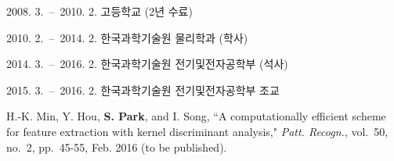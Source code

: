 \documentclass[master,english,final,hidelinks]{kaist-ucs}
\begin{document}
	\curriculumvitae[4]

	\begin{personaldata}
		\address    {}
	\end{personaldata}

	\begin{education}
		\item[2008. 3.\ --\ 2010. 2.] 고등학교 (2년 수료)
		\item[2010. 2.\ --\ 2014. 2.] 한국과학기술원 물리학과 (학사)
		\item[2014. 3.\ --\ 2016. 2.] 한국과학기술원 전기및전자공학부 (석사)
	\end{education}

	\begin{career}
		\item[2015. 3.\ --\ 2016. 2.] 한국과학기술원 전기및전자공학부 조교
	\end{career}


	\begin{publication}
		\item H.-K. Min, Y. Hou, {\bf S. Park}, and I. Song,
		``A computationally efficient scheme for feature extraction with kernel discriminant analysis,"
		\textit{Patt. Recogn.}, vol.~50, no.~2, pp.~45-55, Feb. 2016 (to be published).
	\end{publication}

	\appendix
	

	\label{paperlastpagelabel}     %
\end{document}
